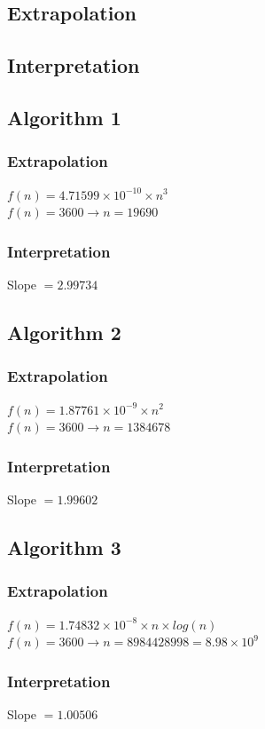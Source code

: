 \documentclass[a4paper,10pt]{article}
\begin{document}
		\subsection{Extrapolation}
			
		\subsection{Interpretation}

		\subsection{Algorithm 1}
			\subsubsection{Extrapolation}
				$f(n) = 4.71599 \times 10^{-10} \times n^3$\\
				$f(n) = 3600 \to n = 19690$\\
			\subsubsection{Interpretation}
				Slope $= 2.99734$
		
		\subsection{Algorithm 2}
			\subsubsection{Extrapolation}
				$f(n) = 1.87761 \times 10^{-9} \times n^2$\\
				$f(n) = 3600 \to n = 1384678$
			\subsubsection{Interpretation}
				Slope $= 1.99602$
		\subsection{Algorithm 3}
			\subsubsection{Extrapolation}
				$f(n) = 1.74832 \times 10^{-8} \times n \times log(n)$\\
				$f(n) = 3600 \to n = 8984428998 =8.98 \times 10^9$
			\subsubsection{Interpretation}
				Slope $= 1.00506$
\end{document}
